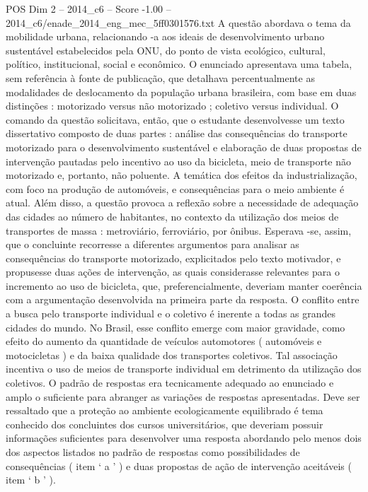 \begin{textsample}{POS Dim 2 – 2014\_c6 – Score -1.00 – 2014\_c6/enade\_2014\_eng\_mec\_5ff0301576.txt}
A questão abordava o tema da mobilidade urbana, relacionando -a aos ideais de desenvolvimento urbano sustentável estabelecidos pela ONU, do ponto de vista ecológico, cultural, político, institucional, social e econômico.
O enunciado apresentava uma tabela, sem referência à fonte de publicação, que detalhava percentualmente as modalidades de deslocamento da população urbana brasileira, com base em duas distinções : motorizado versus não motorizado ; coletivo versus individual.
O comando da questão solicitava, então, que o estudante desenvolvesse um texto dissertativo composto de duas partes : análise das consequências do transporte motorizado para o desenvolvimento sustentável e elaboração de duas propostas de intervenção pautadas pelo incentivo ao uso da bicicleta, meio de transporte não motorizado e, portanto, não poluente.
A temática dos efeitos da industrialização, com foco na produção de automóveis, e consequências para o meio ambiente é atual.
Além disso, a questão provoca a reflexão sobre a necessidade de adequação das cidades ao número de habitantes, no contexto da utilização dos meios de transportes de massa : metroviário, ferroviário, por ônibus.
Esperava -se, assim, que o concluinte recorresse a diferentes argumentos para analisar as consequências do transporte motorizado, explicitados pelo texto motivador, e propusesse duas ações de intervenção, as quais considerasse relevantes para o incremento ao uso de bicicleta, que, preferencialmente, deveriam manter coerência com a argumentação desenvolvida na primeira parte da resposta.
O conflito entre a busca pelo transporte individual e o coletivo é inerente a todas as grandes cidades do mundo.
No Brasil, esse conflito emerge com maior gravidade, como efeito do aumento da quantidade de veículos automotores ( automóveis e motocicletas ) e da baixa qualidade dos transportes coletivos.
Tal associação incentiva o uso de meios de transporte individual em detrimento da utilização dos coletivos.
O padrão de respostas era tecnicamente adequado ao enunciado e amplo o suficiente para abranger as variações de respostas apresentadas.
Deve ser ressaltado que a proteção ao ambiente ecologicamente equilibrado é tema conhecido dos concluintes dos cursos universitários, que deveriam possuir informações suficientes para desenvolver uma resposta abordando pelo menos dois dos aspectos listados no padrão de respostas como possibilidades de consequências ( item ‘ a ’ ) e duas propostas de ação de intervenção aceitáveis ( item ‘ b ’ ).

\end{textsample}
